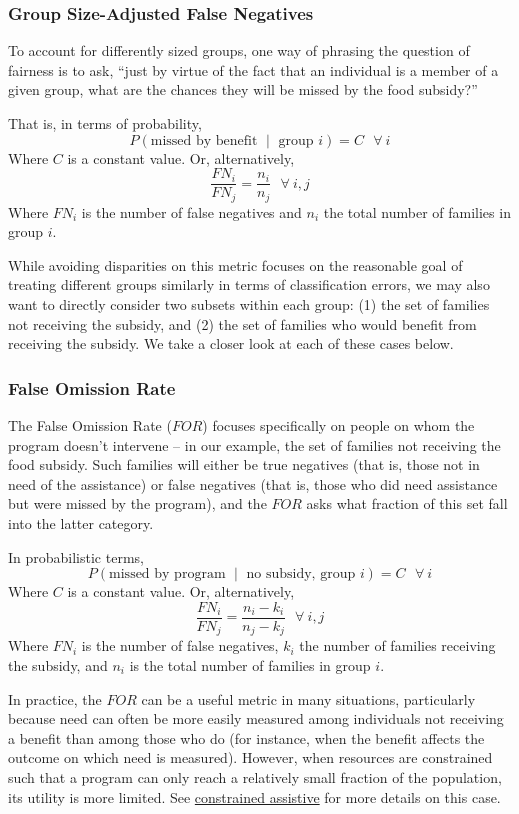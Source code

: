 \documentclass[]{krantz}
\begin{document}
\subsubsection{Group Size-Adjusted False
Negatives}\label{group-size-adjusted-false-negatives}

To account for differently sized groups, one way of phrasing the
question of fairness is to ask, ``just by virtue of the fact that an
individual is a member of a given group, what are the chances they will
be missed by the food subsidy?''

That is, in terms of probability,
\[P(\textrm{missed by benefit $\mid$ group $i$}) = C~~~\forall~i\] Where
\(C\) is a constant value. Or, alternatively,
\[\frac{FN_i}{FN_j} = \frac{n_i}{n_j}~~~\forall~i,j\] Where \(FN_i\) is
the number of false negatives and \(n_i\) the total number of families
in group \(i\).

While avoiding disparities on this metric focuses on the reasonable goal
of treating different groups similarly in terms of classification
errors, we may also want to directly consider two subsets within each
group: (1) the set of families not receiving the subsidy, and (2) the
set of families who would benefit from receiving the subsidy. We take a
closer look at each of these cases below.

\subsubsection{False Omission Rate}\label{false-omission-rate}

The False Omission Rate (\(FOR\)) focuses specifically on people on whom
the program doesn't intervene -- in our example, the set of families not
receiving the food subsidy. Such families will either be true negatives
(that is, those not in need of the assistance) or false negatives (that
is, those who did need assistance but were missed by the program), and
the \(FOR\) asks what fraction of this set fall into the latter
category.

In probabilistic terms,
\[P(\textrm{missed by program $\mid$ no subsidy, group $i$}) = C~~~\forall~i\]
Where \(C\) is a constant value. Or, alternatively,
\[\frac{FN_i}{FN_j} = \frac{n_i-k_i}{n_j-k_j}~~~\forall~i,j\] Where
\(FN_i\) is the number of false negatives, \(k_i\) the number of
families receiving the subsidy, and \(n_i\) is the total number of
families in group \(i\).

In practice, the \(FOR\) can be a useful metric in many situations,
particularly because need can often be more easily measured among
individuals not receiving a benefit than among those who do (for
instance, when the benefit affects the outcome on which need is
measured). However, when resources are constrained such that a program
can only reach a relatively small fraction of the population, its
utility is more limited. See
\protect\hyperlink{sec:constrainedassistive}{constrained assistive} for
more details on this case.
\end{document}
